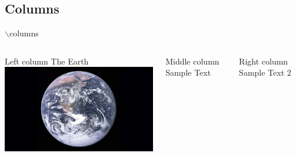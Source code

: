 \documentclass{beamer}
\begin{document}
    \subsection{Columns}
    \begin{frame}{$\backslash$columns}
        \begin{columns}
            \begin{column}{0.3\textwidth}
                \begin{block}{Left column}
        			The Earth \\
        			\includegraphics[width=1\textwidth]{images/Earth.jpg}
    		    \end{block}
                
            \end{column}
            \pause
            
            \begin{column}{0.3\textwidth}
                \begin{exampleblock}{Middle column}
        			Sample Text
    		    \end{exampleblock}
                
            \end{column}
            \pause
            
            \begin{column}{0.3\textwidth}
                \begin{alertblock}{Right column}
        			Sample Text 2
    		    \end{alertblock}
            \end{column}
        \end{columns}
    \end{frame}
    
\end{document}
